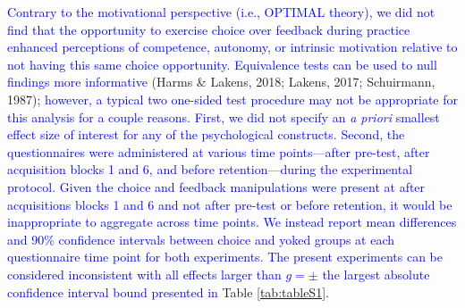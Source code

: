 \documentclass[
  doc, donotrepeattitle,floatsintext]{apa7}
\begin{document}
\textcolor{blue}{Contrary to the motivational perspective (i.e., OPTIMAL theory), we did not find that the opportunity to exercise choice over feedback during practice enhanced perceptions of competence, autonomy, or intrinsic motivation relative to not having this same choice opportunity. Equivalence tests can be used to null findings more informative} (Harms \& Lakens, 2018; Lakens, 2017; Schuirmann, 1987)\textcolor{blue}{; however, a typical two one-sided test procedure may not be appropriate for this analysis for a couple reasons. First, we did not specify an \emph{a priori} smallest effect size of interest for any of the psychological constructs. Second, the questionnaires were administered at various time points---after pre-test, after acquisition blocks 1 and 6, and before retention---during the experimental protocol. Given the choice and feedback manipulations were present at after acquisitions blocks 1 and 6 and not after pre-test or before retention, it would be inappropriate to aggregate across time points. We instead report mean differences and 90\% confidence intervals between choice and yoked groups at each questionnaire time point for both experiments. The present experiments can be considered inconsistent with all effects larger than $g = \pm$ the largest absolute confidence interval bound presented in} Table \ref{tab:tableS1}.

\vspace{1em}
\end{document}
